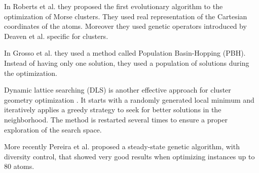 		In Roberts et al. \cite{roberts00} they proposed the first evolutionary algorithm to the optimization of Morse clusters. They used real representation of the Cartesian coordinates of the atoms. Moreover they used genetic operators introduced by Deaven et al. \cite{deaven95} specific for clusters.
		
		In Grosso et al. \cite{grosso07} they used a method called Population Basin-Hopping (PBH). Instead of having only one solution, they used a population of solutions during the optimization.
		
		Dynamic lattice searching (DLS) is another effective approach for cluster geometry optimization \cite{cheng07}. It starts with a randomly generated local minimum and iteratively applies a greedy strategy to seek for better solutions in the neighborhood. The method is restarted several times to ensure a proper exploration of the search space.  
			
		More recently Pereira et al. \cite{xico09} proposed a steady-state genetic algorithm, with diversity control, that showed very good results when optimizing instances up to 80 atoms.
		
